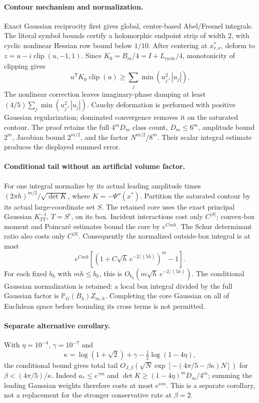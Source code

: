 \paragraph{Contour mechanism and normalization.}
Exact Gaussian reciprocity first gives global, center-based Abel/Fresnel
integrals. The literal symbol bounds certify a holomorphic endpoint strip
of width $2$, with cyclic nonlinear Hessian row bound below $1/10$.
After centering at $x^*_{r,\nu}$, deform to
$z=u-i\operatorname{clip}(u,-1,1)$.
Since $K_0=B_m/4=I+L_{\mathrm{cycle}}/4$, monotonicity of clipping gives
\[
 u^{\mathsf T}K_0\operatorname{clip}(u)
 \ge\sum_j\min(u_j^2,|u_j|).
\]
The nonlinear correction leaves imaginary-phase damping at least
$(4/5)\sum_j\min(u_j^2,|u_j|)$.
Cauchy deformation is performed with positive Gaussian regularization;
dominated convergence removes it on the saturated contour.
The proof retains the full $4^mD_m$ class count, $D_m\le6^m$, amplitude
bound $2^m$, Jacobian bound $2^{m/2}$, and the factor $N^{m/2}/8^m$.
Their scalar integral estimate produces the displayed summed error.

\paragraph{Conditional tail without an artificial volume factor.}
For one integral normalize by its actual leading amplitude times
$(2\pi h)^{m/2}/\sqrt{\det K}$, where $K=-\Psi''(x^*)$.
Partition the saturated contour by its actual large-coordinate set $S$.
The retained core uses the exact principal Gaussian $K_{TT}^{-1}$,
$T=S^c$, on its box. Incident interactions cost only $C^{|S|}$;
convex-box moment and Poincar\'e estimates bound the core by $e^{Cmh}$.
The Schur determinant ratio also costs only $C^{|S|}$. Consequently the
normalized outside-box integral is at most
\[
 e^{Cmh}\left[\left(1+C\sqrt h\,e^{-2/(5h)}\right)^m-1\right].
\]
For each fixed $b_h$ with $mh\le b_h$, this is
$O_{b_h}(m\sqrt h\,e^{-2/(5h)})$.
The conditional Gaussian normalization is retained: a local box integral
divided by the full Gaussian factor is $\mathbb P_G(B_h)Z_{m,h}$.
Completing the core Gaussian on all of Euclidean space before bounding
its cross terms is not permitted.

\paragraph{Separate alternative corollary.}
With $\eta=10^{-4}$, $\gamma=10^{-7}$ and
\[
 \kappa=\log(1+\sqrt2)+\gamma-\tfrac12\log(1-4\eta),
\]
the conditional bound gives total tail
$O_{J,\beta}(\sqrt N\exp[-(4\pi/5-\beta\kappa)N])$
for $\beta<(4\pi/5)/\kappa$.
Indeed $a_*\le e^{\gamma m}$ and
$\det K\ge(1-4\eta)^mD_m/4^m$; summing the leading Gaussian weights
therefore costs at most $e^{\kappa m}$. This is a separate corollary,
not a replacement for the stronger conservative rate at $\beta=2$.

